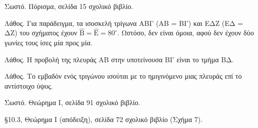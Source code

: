 \begin{alist}
    \item [α)]
    \begin{rlist}
        \item Σωστό. Πόρισμα, σελίδα 15 σχολικό βιβλίο.
        \item Λάθος. Για παράδειγμα, τα ισοσκελή τρίγωνα ΑΒΓ (ΑΒ = ΒΓ) και ΕΔΖ (ΕΔ = ΔΖ) του σχήματος έχουν $\hat{\text{B}} = \hat{\text{E}} = 80^\circ$. Ωστόσο, δεν είναι όμοια, αφού δεν έχουν δύο γωνίες τους ίσες μία προς μία.
        \item Λάθος. Η προβολή της πλευράς ΑΒ στην υποτείνουσα ΒΓ είναι το τμήμα ΒΔ.
        \item Λάθος. Το εμβαδόν ενός τριγώνου ισούται με το ημιγινόμενο μιας πλευράς επί το αντίστοιχο ύψος.
        \item Σωστό. Θεώρημα Ι, σελίδα 91 σχολικό βιβλίο.
    \end{rlist}
    \item [β)] §10.3, Θεώρημα Ι (απόδειξη), σελίδα 72 σχολικό βιβλίο (Σχήμα 7).
\end{alist}
